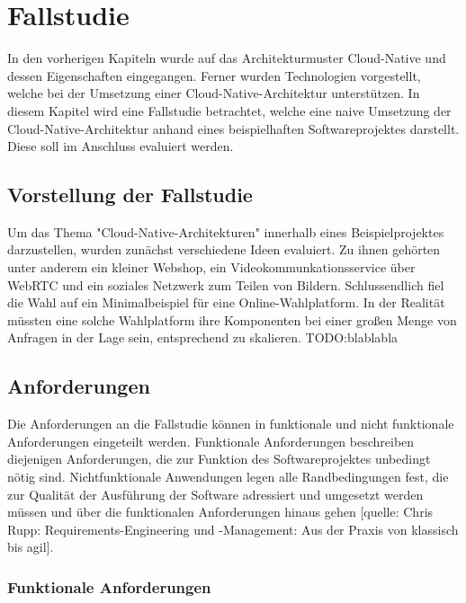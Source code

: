 \chapter{Fallstudie}
\label{ch:fallstudie}
In den vorherigen Kapiteln wurde auf das Architekturmuster Cloud-Native und dessen Eigenschaften eingegangen. Ferner wurden Technologien vorgestellt, welche bei der Umsetzung einer Cloud-Native-Architektur unterstützen. In diesem Kapitel wird eine Fallstudie betrachtet, welche eine naive Umsetzung der Cloud-Native-Architektur anhand eines beispielhaften Softwareprojektes darstellt. Diese soll im Anschluss evaluiert werden.

\section{Vorstellung der Fallstudie}

Um das Thema "Cloud-Native-Architekturen" innerhalb eines Beispielprojektes darzustellen, wurden zunächst verschiedene Ideen evaluiert. Zu ihnen gehörten unter anderem ein kleiner Webshop, ein Videokommunkationsservice über WebRTC und ein soziales Netzwerk zum Teilen von Bildern. Schlussendlich fiel die Wahl auf ein Minimalbeispiel für eine  Online-Wahlplatform. In der Realität müssten eine solche Wahlplatform ihre Komponenten bei einer großen Menge von Anfragen in der Lage sein, entsprechend zu skalieren. TODO:blablabla

\section{Anforderungen}

Die Anforderungen an die Fallstudie können in funktionale und nicht funktionale Anforderungen eingeteilt werden. Funktionale Anforderungen beschreiben diejenigen Anforderungen, die zur Funktion des Softwareprojektes unbedingt nötig sind. Nichtfunktionale Anwendungen legen alle Randbedingungen fest, die zur Qualität der Ausführung der Software adressiert und umgesetzt werden müssen und über die funktionalen Anforderungen hinaus gehen [quelle: Chris Rupp: Requirements-Engineering und -Management: Aus der Praxis von klassisch bis agil]. 

\subsection{Funktionale Anforderungen}

